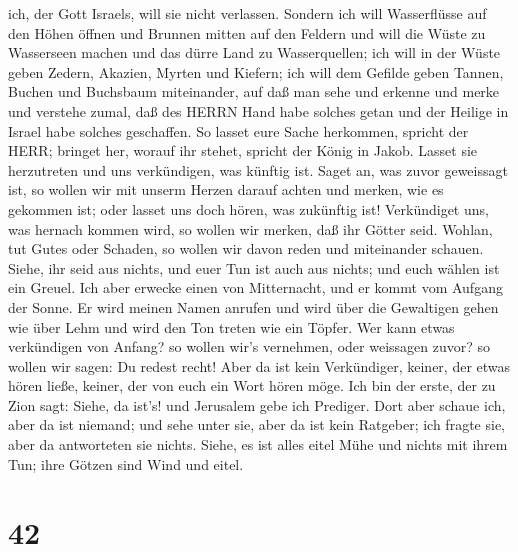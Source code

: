 ich, der Gott Israels, will sie nicht verlassen.  Sondern
ich will Wasserflüsse auf den Höhen öffnen und Brunnen mitten auf den
Feldern und will die Wüste zu Wasserseen machen und das dürre Land zu
Wasserquellen;  ich will in der Wüste geben Zedern,
Akazien, Myrten und Kiefern; ich will dem Gefilde geben Tannen, Buchen
und Buchsbaum miteinander,  auf daß man sehe und erkenne
und merke und verstehe zumal, daß des HERRN Hand habe solches getan und
der Heilige in Israel habe solches geschaffen.  So lasset
eure Sache herkommen, spricht der HERR; bringet her, worauf ihr stehet,
spricht der König in Jakob.  Lasset sie herzutreten und uns
verkündigen, was künftig ist. Saget an, was zuvor geweissagt ist, so
wollen wir mit unserm Herzen darauf achten und merken, wie es gekommen
ist; oder lasset uns doch hören, was zukünftig ist! 
Verkündiget uns, was hernach kommen wird, so wollen wir merken, daß ihr
Götter seid. Wohlan, tut Gutes oder Schaden, so wollen wir davon reden
und miteinander schauen.  Siehe, ihr seid aus nichts, und
euer Tun ist auch aus nichts; und euch wählen ist ein Greuel.
 Ich aber erwecke einen von Mitternacht, und er kommt vom
Aufgang der Sonne. Er wird meinen Namen anrufen und wird über die
Gewaltigen gehen wie über Lehm und wird den Ton treten wie ein Töpfer.
 Wer kann etwas verkündigen von Anfang? so wollen wir's
vernehmen, oder weissagen zuvor? so wollen wir sagen: Du redest recht!
Aber da ist kein Verkündiger, keiner, der etwas hören ließe, keiner, der
von euch ein Wort hören möge.  Ich bin der erste, der zu
Zion sagt: Siehe, da ist's! und Jerusalem gebe ich Prediger.
 Dort aber schaue ich, aber da ist niemand; und sehe unter
sie, aber da ist kein Ratgeber; ich fragte sie, aber da antworteten sie
nichts.  Siehe, es ist alles eitel Mühe und nichts mit
ihrem Tun; ihre Götzen sind Wind und eitel.

\hypertarget{section-41}{%
\section{42}\label{section-41}}

